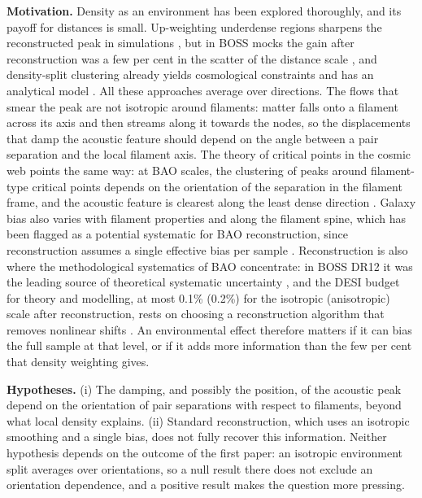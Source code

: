 \documentclass[11pt,a4paper]{article}
\begin{document}
\textbf{Motivation.} Density as an environment has been explored thoroughly, and its payoff for distances is small. Up-weighting underdense regions sharpens the reconstructed peak in simulations \citep{Achitouv2015}, but in BOSS mocks the gain after reconstruction was a few per cent in the scatter of the distance scale \citep{Blake2018}, and density-split clustering already yields cosmological constraints \citep{Paillas2023} and has an analytical model \citep{Pinon2025}. All these approaches average over directions. The flows that smear the peak are not isotropic around filaments: matter falls onto a filament across its axis and then streams along it towards the nodes, so the displacements that damp the acoustic feature should depend on the angle between a pair separation and the local filament axis. The theory of critical points in the cosmic web points the same way: at BAO scales, the clustering of peaks around filament-type critical points depends on the orientation of the separation in the filament frame, and the acoustic feature is clearest along the least dense direction \citep{Shim2020}. Galaxy bias also varies with filament properties and along the filament spine, which has been flagged as a potential systematic for BAO reconstruction, since reconstruction assumes a single effective bias per sample \citep{SotoSuarez2026}. Reconstruction is also where the methodological systematics of BAO concentrate: in BOSS DR12 it was the leading source of theoretical systematic uncertainty \citep{VargasMagana2018}, and the DESI budget for theory and modelling, at most 0.1\% (0.2\%) for the isotropic (anisotropic) scale after reconstruction, rests on choosing a reconstruction algorithm that removes nonlinear shifts \citep{Chen2024}. An environmental effect therefore matters if it can bias the full sample at that level, or if it adds more information than the few per cent that density weighting gives.

\textbf{Hypotheses.} (i) The damping, and possibly the position, of the acoustic peak depend on the orientation of pair separations with respect to filaments, beyond what local density explains. (ii) Standard reconstruction, which uses an isotropic smoothing and a single bias, does not fully recover this information. Neither hypothesis depends on the outcome of the first paper: an isotropic environment split averages over orientations, so a null result there does not exclude an orientation dependence, and a positive result makes the question more pressing.
\end{document}
